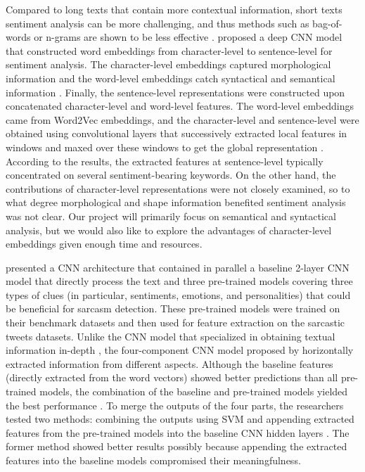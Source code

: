 \documentclass[12pt]{diazessay} %
\begin{document}
{Compared to long texts that contain more contextual information, short texts sentiment analysis can be more challenging, and thus methods such as bag-of-words or n-grams are shown to be less effective \citep{barbosa2010, santos2014}. \citep{santos2014} proposed a deep CNN model that constructed word embeddings from character-level to sentence-level for sentiment analysis. The character-level embeddings captured morphological information and the word-level embeddings catch syntactical and semantical information \citep{santos2014}. Finally, the sentence-level representations were constructed upon concatenated character-level and word-level features. The word-level embeddings came from Word2Vec embeddings, and the character-level and sentence-level were obtained using convolutional layers that successively extracted local features in windows and maxed over these windows to get the global representation \citep{santos2014}. According to the results, the extracted features at sentence-level typically concentrated on several sentiment-bearing keywords. On the other hand, the contributions of character-level representations were not closely examined, so to what degree morphological and shape information benefited sentiment analysis was not clear. Our project will primarily focus on semantical and syntactical analysis, but we would also like to explore the advantages of character-level embeddings given enough time and resources. 

\citet{poria2017} presented a CNN architecture that contained in parallel a baseline 2-layer CNN model that directly process the text and three pre-trained models covering three types of clues (in particular, sentiments, emotions, and personalities) that could be beneficial for sarcasm detection. These pre-trained models were trained on their benchmark datasets and then used for feature extraction on the sarcastic tweets datasets. Unlike the CNN model that specialized in obtaining textual information in-depth \citep{santos2014}, the four-component CNN model proposed by \citet{poria2017} horizontally extracted information from different aspects. Although the baseline features (directly extracted from the word vectors) showed better predictions than all pre-trained models, the combination of the baseline and pre-trained models yielded the best performance \citep{poria2017}. To merge the outputs of the four parts, the researchers tested two methods: combining the outputs using SVM and appending extracted features from the pre-trained models into the baseline CNN hidden layers \citep{poria2017}.  The former method showed better results possibly because appending the extracted features into the baseline models compromised their meaningfulness.\\

}
\end{document}
